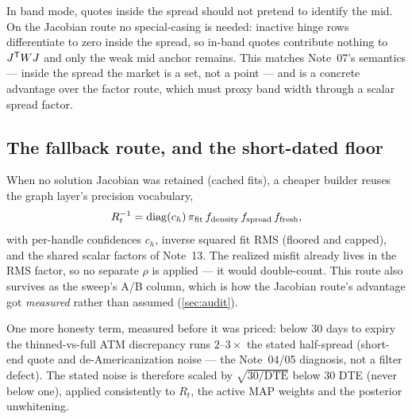 \documentclass[11pt]{article}
\begin{document}
\begin{remark}
In band mode, quotes inside the spread should not pretend to identify
the mid.  On the Jacobian route no special-casing is needed: inactive
hinge rows differentiate to zero inside the spread, so in-band quotes
contribute nothing to $J^{\mathsf{T}} WJ$ and only the weak mid anchor remains.
This matches Note~07's semantics --- inside the spread the market is a
set, not a point --- and is a concrete advantage over the factor route,
which must proxy band width through a scalar spread factor.
\end{remark}

\subsection{The fallback route, and the short-dated floor}

When no solution Jacobian was retained (cached fits), a cheaper builder
reuses the graph layer's precision vocabulary,
\begin{equation}
R_t^{-1}
=\operatorname{diag}(c_h)\,\pi_{\mathrm{fit}}\,
f_{\mathrm{density}}\,f_{\mathrm{spread}}\,f_{\mathrm{fresh}},
\label{eq:cheapR}
\end{equation}
with per-handle confidences $c_h$, inverse squared fit RMS (floored and
capped), and the shared scalar factors of Note~13.  The realized misfit
already lives in the RMS factor, so no separate $\rho$ is applied ---
it would double-count.  This route also survives as the sweep's A/B
column, which is how the Jacobian route's advantage got \emph{measured}
rather than assumed (\cref{sec:audit}).

One more honesty term, measured before it was priced: below $30$ days
to expiry the thinned-vs-full ATM discrepancy runs $2$--$3\times$ the
stated half-spread (short-end quote and de-Americanization noise --- the
Note~04/05 diagnosis, not a filter defect).  The stated noise is
therefore scaled by $\sqrt{30/\mathrm{DTE}}$ below $30$
DTE (never below one), applied consistently to $R_t$, the active MAP
weights and the posterior unwhitening.
\end{document}
